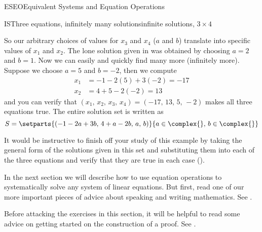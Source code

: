 \begin{subsect}{ESEO}{Equivalent Systems and Equation Operations}
\begin{example}{IS}{Three equations, infinitely many solutions}{infinite solutions, $3\times 4$}
\begin{para}
\end{para}
%
\begin{para}So our arbitrary choices of values for $x_3$ and $x_4$ ($a$ and $b$) translate into specific values of $x_1$ and $x_2$.  The lone solution given in  was obtained by choosing $a=2$ and $b=1$.  Now we can easily and quickly find many more (infinitely more).   Suppose we choose $a=5$ and $b=-2$, then we compute
%
\begin{align*}
x_1&=-1-2(5)+3(-2)=-17\\
x_2&=4+5-2(-2)=13
\end{align*}
%
and you can verify that $(x_1,\,x_2,\,x_3,\,x_4)=(-17,\,13,\,5,\,-2)$ makes all three equations true.  The entire solution set is written as
%
\begin{equation*}
S=\setparts{(-1-2a+3b,\,4 +a-2b,\,a,\,b)}{ a\in\complex{\null},\,b\in\complex{\null}}
\end{equation*}
\end{para}
%
\begin{para}It would be instructive to finish off your study of this example by taking the general form of the solutions given in this set and substituting them into each of the three equations and verify that they are true in each case ().\end{para}
\end{example}
%
\begin{para}In the next section we will describe how to use equation operations to systematically solve any system of linear equations.  But first, read one of our more important pieces of advice about speaking and writing mathematics.  See .\end{para}
%
\begin{para}Before attacking the exercises in this section, it will be helpful to read some advice on getting started on the construction of a proof.  See .\end{para}
%
%
\end{subsect}
%
